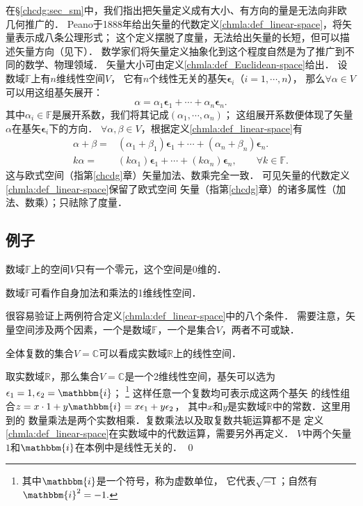 在\S\ref{chcdg:sec_sm}中，我们指出把矢量定义成有大小、有方向的量是无法向非欧几何推广的．
Peano于1888年给出{\kaishu 矢量}的代数定义\ref{chmla:def_linear-space}，将矢量表示成八条公理形式；
这个定义摆脱了度量，无法给出矢量的长短，但可以描述矢量方向（见下）．
数学家们将矢量定义抽象化到这个程度自然是为了推广到不同的数学、物理领域．
矢量大小可由定义\ref{chmla:def_Euclidean-space}给出．
设数域$\mathbb{F}$上有$n$维线性空间$V$，
它有$n$个线性无关的基矢$\boldsymbol{\epsilon}_i$（$i=1,\cdots,n$），
那么$\forall \alpha \in V$可以用这组基矢展开：
\begin{equation}
	\alpha = \alpha_1 \boldsymbol{\epsilon}_1 +\cdots +\alpha_n \boldsymbol{\epsilon}_n.
\end{equation}
其中$\alpha_i\in \mathbb{F}$是展开系数，我们将其记成$(\alpha_1,\cdots,\alpha_n)$；
这组展开系数便体现了矢量$\alpha$在基矢$\boldsymbol{\epsilon}_i$下的{\kaishu 方向}．
$\forall \alpha ,\beta \in V$，根据定义\ref{chmla:def_linear-space}有
\begin{align}
	\alpha + \beta =& (\alpha_1+\beta_1)\boldsymbol{\epsilon}_1 +\cdots+(\alpha_n+\beta_n)\boldsymbol{\epsilon}_n .\\
	k\alpha =& (k\alpha_1) \boldsymbol{\epsilon}_1 +\cdots +(k\alpha_n) \boldsymbol{\epsilon}_n, 
	\qquad \forall k\in \mathbb{F}.
\end{align}
这与欧式空间（指第\ref{chcdg}章）矢量加法、数乘完全一致．
可见矢量的代数定义\ref{chmla:def_linear-space}保留了欧式空间
矢量（指第\ref{chcdg}章）的诸多属性（加法、数乘）；只祛除了度量．


\subsection{例子}
\begin{example}\label{chmla:exm_zero}
    数域$\mathbb{F}$上的空间$V$只有一个零元，这个空间是0维的．
\end{example}
\begin{example}\label{chmla:exm_vsF}
    数域$\mathbb{F}$可看作自身加法和乘法的1维线性空间．
\end{example}
很容易验证上两例符合定义\ref{chmla:def_linear-space}中的八个条件．
需要注意，矢量空间涉及两个因素，一个是数域$\mathbb{F}$，一个是集合$V$，两者不可或缺．
\begin{example}\label{chmla:exm_rc1}
    全体复数的集合$V=\mathbb{C}$可以看成实数域$\mathbb{R}$上的线性空间．
\end{example}
取实数域$\mathbb{R}$，那么集合$V=\mathbb{C}$是一个2维线性空间，基矢可以选为
$\epsilon_1=1,\epsilon_2=\mathbbm{i}$；
{\footnote{其中$\mathbbm{i}$是一个符号，称为虚数单位，
        它代表$\sqrt{-1}$；自然有$\mathbbm{i}^2=-1.$}}
这样任意一个复数均可表示成这两个基矢
的线性组合$z=x\cdot 1+y\mathbbm{i}=x\epsilon_1+y\epsilon_2$，
其中$x$和$y$是实数域$\mathbb{R}$中的常数．这里用到的
数量乘法是两个实数相乘．复数乘法以及取复数共轭运算都不是
定义\ref{chmla:def_linear-space}在实数域中的代数运算，需要另外再定义．
$V$中两个矢量$1$和$\mathbbm{i}$在本例中是线性无关的．
\qed

